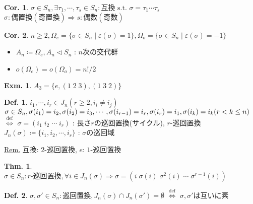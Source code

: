 \documentclass[uplatex,dvipdfmx,9pt]{beamer}
\newcommand{\defarrow}{\overset{\mathrm{def}}{\Leftrightarrow}}
\newcommand{\nsubgroup}{\vartriangleleft} %
\newcommand{\st}{\text{ s.t. }}
\newcommand{\lt}{\ensuremath <}
\newcounter{textThmCount}
\theoremstyle{definition} %
\newtheorem{defn}{Def.}[subsection] %
\newtheorem{thm}{Thm.}[subsection] %
\newtheorem{corText}{Cor.}[textThmCount] %
\theoremstyle{example}
\newtheorem{exm}{Exm.}[subsection]
\begin{document}
      \begin{frame}

        \begin{corText}
          $\sigma \in S_n, \exists \tau_1, \cdots, \tau_s \in S_n :\text{互換} \st \sigma = \tau_1 \cdots \tau_s$ \\
          $\sigma : \text{偶置換} (\text{奇置換}) \Rightarrow s : \text{偶数} (\text{奇数})$
        \end{corText}

        \begin{corText}
          $n \ge 2, \Omega_e = \{ \sigma \in S_n \mid \varepsilon(\sigma) = 1\}, \Omega_o = \{ \sigma \in S_n \mid \varepsilon(\sigma) = -1\}$
          \begin{itemize}
            \item $A_n \coloneqq \Omega_e, A_n \nsubgroup S_n$ : \alert{$n$次の交代群}
            \item $o(\Omega_e) = o(\Omega_o) = n!/2$
          \end{itemize}
        \end{corText}

        \begin{exm}
          $A_3 = \{ e, (1 \; 2 \; 3), (1 \; 3 \; 2) \}$
        \end{exm}
          
      \end{frame}

      \begin{frame}

        \begin{defn}
          $i_1, \cdots, i_r \in J_n (r \ge 2, i_i \ne i_j)$ \\
          $\sigma \in S_n, \sigma(i_1) = i_2, \sigma(i_2) = i_3, \cdots, \sigma(i_{r-1}) = i_r, \sigma(i_r) = i_1, \sigma(i_k) = i_k (r \lt k \le n)$ \\
          $\defarrow$ $\sigma = (i_1 \; i_2 \; \cdots \; i_r)$ : \alert{長さ$r$}の\alert{巡回置換}(\alert{サイクル}), $r$-巡回置換 \\
          $J_n(\sigma) \coloneqq \{i_1, i_2, \cdots, i_r\}$ : $\sigma$の\alert{巡回域}
        \end{defn}
        \underline{Rem.} 互換: $2$-巡回置換, $e$: $1$-巡回置換

        \begin{thm}
          $\sigma \in S_n : \text{$r$-巡回置換}, \forall i \in J_n(\sigma) \Rightarrow \sigma = (i \; \sigma(i) \; \sigma^2(i) \; \cdots \; \sigma^{r-1}(i)) \quad$
        \end{thm}

        \begin{defn}
          $\sigma, \sigma' \in S_n :\text{巡回置換}, J_n(\sigma) \cap J_n(\sigma') = \emptyset$ $\defarrow$ $\sigma, \sigma'$は\alert{互いに素}
        \end{defn}

      \end{frame}
\end{document}
